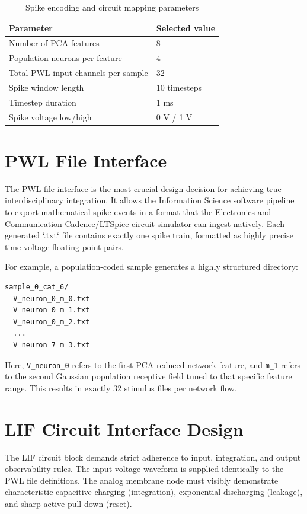 \begin{table}[H]
\centering
\caption{Spike encoding and circuit mapping parameters}
\label{tab:encodingparams}
\begin{tabular}{|p{}|p{}|}
\hline
\textbf{Parameter} & \textbf{Selected value} \\
\hline
Number of PCA features & 8 \\
\hline
Population neurons per feature & 4 \\
\hline
Total PWL input channels per sample & 32 \\
\hline
Spike window length & 10 timesteps \\
\hline
Timestep duration & 1 ms \\
\hline
Spike voltage low/high & 0 V / 1 V \\
\hline
\end{tabular}
\end{table}

\section{PWL File Interface}

The PWL file interface is the most crucial design decision for achieving true interdisciplinary integration. It allows the Information Science software pipeline to export mathematical spike events in a format that the Electronics and Communication Cadence/LTSpice circuit simulator can ingest natively. Each generated `.txt` file contains exactly one spike train, formatted as highly precise time-voltage floating-point pairs.

For example, a population-coded sample generates a highly structured directory:
\begin{verbatim}
sample_0_cat_6/
  V_neuron_0_m_0.txt
  V_neuron_0_m_1.txt
  V_neuron_0_m_2.txt
  ...
  V_neuron_7_m_3.txt
\end{verbatim}
Here, \texttt{V\_neuron\_0} refers to the first PCA-reduced network feature, and \texttt{m\_1} refers to the second Gaussian population receptive field tuned to that specific feature range. This results in exactly 32 stimulus files per network flow.

\section{LIF Circuit Interface Design}

The LIF circuit block demands strict adherence to input, integration, and output observability rules. The input voltage waveform is supplied identically to the PWL file definitions. The analog membrane node must visibly demonstrate characteristic capacitive charging (integration), exponential discharging (leakage), and sharp active pull-down (reset). 

